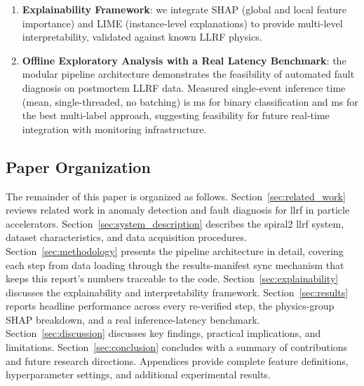 \begin{enumerate}
    \item \textbf{Explainability Framework}: we integrate SHAP (global and local feature importance) and LIME (instance-level explanations) to provide multi-level interpretability, validated against known LLRF physics.

    \item \textbf{Offline Exploratory Analysis with a Real Latency Benchmark}: the modular pipeline architecture demonstrates the feasibility of automated fault diagnosis on postmortem LLRF data. Measured single-event inference time (mean, single-threaded, no batching) is \MetricInferenceLatencyBenchmarkStepZeroSixBinaryRfMeanMs{}ms for binary classification and \MetricInferenceLatencyBenchmarkPhaseCLabelPowersetMeanMs{}ms for the best multi-label approach, suggesting feasibility for future real-time integration with monitoring infrastructure.
\end{enumerate}

\subsection{Paper Organization}

The remainder of this paper is organized as follows. Section~\ref{sec:related_work} reviews related work in anomaly detection and fault diagnosis for \gls{llrf} in particle accelerators. Section~\ref{sec:system_description} describes the \gls{spiral2} \gls{llrf} system, dataset characteristics, and data acquisition procedures. Section~\ref{sec:methodology} presents the pipeline architecture in detail, covering each step from data loading through the results-manifest sync mechanism that keeps this report's numbers traceable to the code. Section~\ref{sec:explainability} discusses the explainability and interpretability framework. Section~\ref{sec:results} reports headline performance across every re-verified step, the physics-group SHAP breakdown, and a real inference-latency benchmark. Section~\ref{sec:discussion} discusses key findings, practical implications, and limitations. Section~\ref{sec:conclusion} concludes with a summary of contributions and future research directions. Appendices provide complete feature definitions, hyperparameter settings, and additional experimental results.